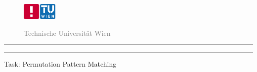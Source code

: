 %
%
%	

\clearpage{} %
\newcommand*{\marginLeft}{1.0cm}
\begin{titlepage}
		\vspace*{-2.50cm}
		
		\ifshowTitleHeader
		\begin{figure}[htbp]
			\begin{minipage}[t]{4cm}
				\vspace{0pt}
				\hspace{1.45cm}
				\includegraphics[width=1.7cm]{img/logo_tuwien_with_informatics.png}
			\end{minipage}
			\hspace{-0.7cm}
			\begin{minipage}[t]{7cm}
				\vspace{9pt}
				\fontsize{0.45cm}{0.1cm}\selectfont
				\textsf{\textcolor{gray}{Technische Universität Wien}}
			\end{minipage}
		\end{figure}
		\fi
		
		\vspace*{4.0cm}
		\hrule
		\vspace*{3mm}
		\fontsize{0.5cm}{0.1cm}\selectfont
		\hspace{\marginLeft}
		\textrm{\docInstituteNum}
		
		
		\fontsize{0.8cm}{0.1cm}\selectfont
		\hspace{0.5cm}
		\textrm{\docLvaName} \fontsize{0.6cm}{0.1cm}\selectfont\textrm{\textcolor{gray}{\docSemester}}
		
		\vspace*{0mm}
		\fontsize{0.55cm}{0.1cm}\selectfont
		\hspace{\marginLeft}
		\textrm{\docExerciseName}
		
		\vspace*{5mm}
		\hrule
		
		\vspace*{5cm}
		\fontsize{0.55cm}{0.1cm}\selectfont
		\hspace{\marginLeft}
		\textrm{Task: Permutation Pattern Matching}		
		

\end{titlepage}
